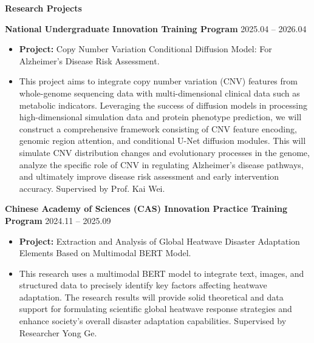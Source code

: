 \documentclass[11pt]{article}
\begin{document}
	\begin{center}
		\textbf{\large Research Projects}
	\end{center}
	\textbf{National Undergraduate Innovation Training Program} \hfill 2025.04 – 2026.04
	\begin{itemize}[noitemsep, topsep=0pt, partopsep=0pt, parsep=0pt, leftmargin=*]
		\item \textbf{Project:} Copy Number Variation Conditional Diffusion Model: For Alzheimer's Disease Risk Assessment.
		\item This project aims to integrate copy number variation (CNV) features from whole-genome sequencing data with multi-dimensional clinical data such as metabolic indicators. Leveraging the success of diffusion models in processing high-dimensional simulation data and protein phenotype prediction, we will construct a comprehensive framework consisting of CNV feature encoding, genomic region attention, and conditional U-Net diffusion modules. This will simulate CNV distribution changes and evolutionary processes in the genome, analyze the specific role of CNV in regulating Alzheimer's disease pathways, and ultimately improve disease risk assessment and early intervention accuracy. Supervised by Prof. Kai Wei.
	\end{itemize}
	
	\vspace{10pt}
	
	\textbf{Chinese Academy of Sciences (CAS) Innovation Practice Training Program} \hfill 2024.11 – 2025.09
	\begin{itemize}[noitemsep, topsep=0pt, partopsep=0pt, parsep=0pt, leftmargin=*]
		\item \textbf{Project:} Extraction and Analysis of Global Heatwave Disaster Adaptation Elements Based on Multimodal BERT Model.
		\item This research uses a multimodal BERT model to integrate text, images, and structured data to precisely identify key factors affecting heatwave adaptation. The research results will provide solid theoretical and data support for formulating scientific global heatwave response strategies and enhance society's overall disaster adaptation capabilities. Supervised by Researcher Yong Ge.
	\end{itemize}
	
	\vspace{10pt}
	
\end{document}
